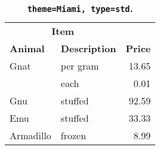 \begin{table}[!htb]
\large
\centering
\begin{tabular}{llr}
\multicolumn{2}{c}{\textbf{Item}} & \multicolumn{1}{c}{\textbf{}}            \\
\textbf{Animal}                   & \multicolumn{1}{c}{\textbf{Description}} & \multicolumn{1}{c}{\textbf{Price}} \\
\hline
Gnat      & per gram & 13.65 \\
          & each     & 0.01  \\
Gnu       & stuffed  & 92.59 \\
Emu       & stuffed  & 33.33 \\
Armadillo & frozen   & 8.99  \\
\end{tabular}
\caption[\texttt{theme=Miami, type=std}]{\textbf{\texttt{theme=Miami, type=std}. }}
\end{table}
